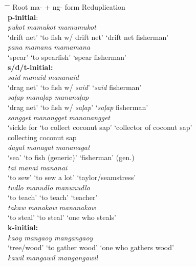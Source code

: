 \ea
\label{ex:net}
\begin{tabbing}
\hspace{3cm} \= \hspace{4cm} \= \kill
Root \> ma- + ng- form  \>  Reduplication \\
\textbf{p-initial}: \\
\textit{pukot}  \> \textit{mamukot} \> \textit{mamumukot} \\
‘drift net’ \>  ‘to fish w/ drift net’ \> ‘drift net fisherman’ \\
\textit{pana} \> \textit{mamana}   \>  \textit{mamamana} \\
‘spear’ \> ‘to spearfish’ \> ‘spear fisherman’ \\
\textbf{s/d/t-initial:} \\
\textit{said}  \> \textit{manaid} \> \textit{mananaid} \\
‘drag net’ \> ‘to fish w/ \textit{said}’ \> ‘\textit{said} fisherman’ \\
\textit{saļap}\footnotemark{} \> \textit{manaļap}  \> \textit{mananaļap} \\
`drag net’ \> ‘to fish w/ \textit{saļap}’ \> ‘\textit{saļap} fisherman’ \\
\textit{sangget} \> \textit{manangget} \> \textit{mananangget} \\
‘sickle for \>  ‘to collect coconut sap' \>  ‘collector of coconut sap' \\
collecting coconut sap \\
\textit{dagat} \> \textit{managat} \> \textit{mananagat} \\
‘sea’ \>  ‘to fish (generic)’ \>  ‘fisherman’ (gen.) \\
\textit{tai} \> \textit{manai} \> \textit{mananai} \\
‘to sew’ \>  ‘to sew a lot’ \>  ‘taylor/seamstress’ \\
\textit{tudlo} \> \textit{manudlo} \> \textit{manunudlo} \\
‘to teach’ \>  ‘to teach’ \>  ‘teacher’ \\
\textit{takaw} \> \textit{manakaw} \> \textit{mananakaw} \\
‘to steal’ \>  ‘to steal’ \> ‘one who steals’ \\
\textbf{k-initial:} \\
\textit{kaoy} \> \textit{mangaoy} \> \textit{mangangaoy} \\
‘tree/wood’ \>  ‘to gather wood’ \> ‘one who gathers wood’ \\
\textit{kawil} \> \textit{mangawil} \> \textit{mangangawil} \\

\end{tabbing}

